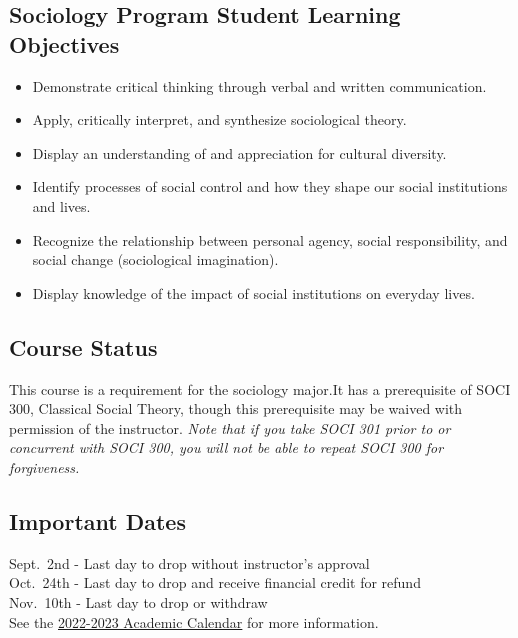 \documentclass[11pt,]{article}
\providecommand{\tightlist}{%
  \setlength{\itemsep}{0pt}\setlength{\parskip}{0pt}}
\begin{document}
\hypertarget{sociology-program-student-learning-objectives}{%
\subsection{Sociology Program Student Learning
Objectives}\label{sociology-program-student-learning-objectives}}

\begin{itemize}
\tightlist
\item
  Demonstrate critical thinking through verbal and written
  communication.
\item
  Apply, critically interpret, and synthesize sociological theory.
\item
  Display an understanding of and appreciation for cultural diversity.
\item
  Identify processes of social control and how they shape our social
  institutions and lives.
\item
  Recognize the relationship between personal agency, social
  responsibility, and social change (sociological imagination).
\item
  Display knowledge of the impact of social institutions on everyday
  lives.
\end{itemize}

\hypertarget{course-status}{%
\subsection{Course Status}\label{course-status}}

This course is a requirement for the sociology major.It has a
prerequisite of SOCI 300, Classical Social Theory, though this
prerequisite may be waived with permission of the instructor. \emph{Note
that if you take SOCI 301 prior to or concurrent with SOCI 300, you will
not be able to repeat SOCI 300 for forgiveness.}

\hypertarget{important-dates}{%
\subsection{Important Dates}\label{important-dates}}

Sept.~2nd - Last day to drop without instructor's approval\\
Oct.~24th - Last day to drop and receive financial credit for refund\\
Nov.~10th - Last day to drop or withdraw\\
See the
\href{https://www.csuchico.edu/apss/calendar/aca-cal-2022-23.shtml}{2022-2023
Academic Calendar} for more information.
\end{document}
